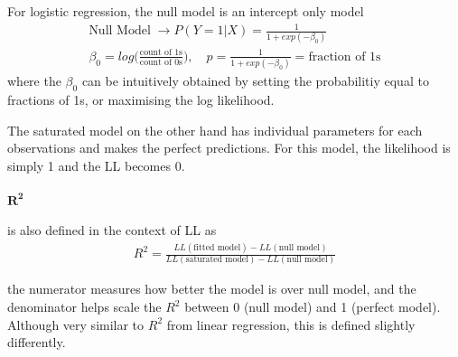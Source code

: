 \documentclass[../statistical_learning_notes.tex]{subfiles}
\begin{document}
    For logistic regression, the null model is an intercept only model
    \begin{gather*}
        \text{Null Model}\; \rightarrow P(Y=1|X) = \frac{1}{1 + exp(-\beta_{0})}\\
        \beta_{0} = log \big( \frac{\text{count of 1s}}{\text{count of 0s}} \big), \quad p = \frac{1}{1 + exp(-\beta_{0})} = \text{fraction of 1s}
    \end{gather*}
    where the $\beta_{0}$ can be intuitively obtained by setting the probabilitiy equal to fractions of 1s, or maximising the log likelihood.\newline

    The saturated model on the other hand has individual parameters for each observations and makes the perfect predictions. For this model, the likelihood is simply 1 and the LL becomes 0.

    \paragraph{$\mathbf{R^{2}}$} is also defined in the context of LL as
    \begin{align*}
        R^{2} = \frac{LL(\text{fitted model}) - LL(\text{null model})}{LL(\text{saturated model}) - LL(\text{null model})}
    \end{align*}

    the numerator measures how better the model is over null model, and the denominator helps scale the $R^{2}$ between 0 (null model) and 1 (perfect model). Although very similar to $R^{2}$ from linear regression, this is defined slightly differently.


\end{document}
